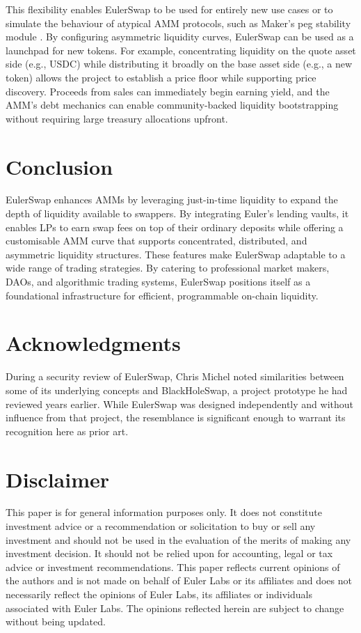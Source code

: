 \documentclass{article}
\begin{document}
This flexibility enables EulerSwap to be used for entirely new use cases or to simulate the behaviour of atypical AMM protocols, such as Maker's peg stability module \cite{makerdaoPSM}. By configuring asymmetric liquidity curves, EulerSwap can be used as a launchpad for new tokens. For example, concentrating liquidity on the quote asset side (e.g., USDC) while distributing it broadly on the base asset side (e.g., a new token) allows the project to establish a price floor while supporting price discovery. Proceeds from sales can immediately begin earning yield, and the AMM's debt mechanics can enable community-backed liquidity bootstrapping without requiring large treasury allocations upfront.

\section{Conclusion}

EulerSwap enhances AMMs by leveraging just-in-time liquidity to expand the depth of liquidity available to swappers. By integrating Euler's lending vaults, it enables LPs to earn swap fees on top of their ordinary deposits while offering a customisable AMM curve that supports concentrated, distributed, and asymmetric liquidity structures. These features make EulerSwap adaptable to a wide range of trading strategies. By catering to professional market makers, DAOs, and algorithmic trading systems, EulerSwap positions itself as a foundational infrastructure for efficient, programmable on-chain liquidity. 

\section*{Acknowledgments}

During a security review of EulerSwap, Chris Michel noted similarities between some of its underlying concepts and BlackHoleSwap, a project prototype he had reviewed years earlier. While EulerSwap was designed independently and without influence from that project, the resemblance is significant enough to warrant its recognition here as prior art.

\section*{Disclaimer}

This paper is for general information purposes only. It does not constitute investment
advice or a recommendation or solicitation to buy or sell any investment and should not
be used in the evaluation of the merits of making any investment decision. It should not
be relied upon for accounting, legal or tax advice or investment recommendations. This
paper reflects current opinions of the authors and is not made on behalf of Euler Labs or its
affiliates and does not necessarily reflect the opinions of Euler Labs, its affiliates or individuals
associated with Euler Labs. The opinions reflected herein are subject to change without being
updated.
\end{document}
